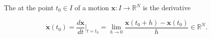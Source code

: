 The  at the point $t_0 \in I$ of a motion $\mathbf{x}: I \rightarrow \mathbb{R}^N$ is the derivative

$$\dot{\mathbf{x}}(t_0) = \frac{d\mathbf{x}}{dt} \bigg|_{t=t_0} = \lim_{h \to 0} \frac{\mathbf{x}(t_0 + h) - \mathbf{x}(t_0)}{h} \in \mathbb{R}^N.$$
